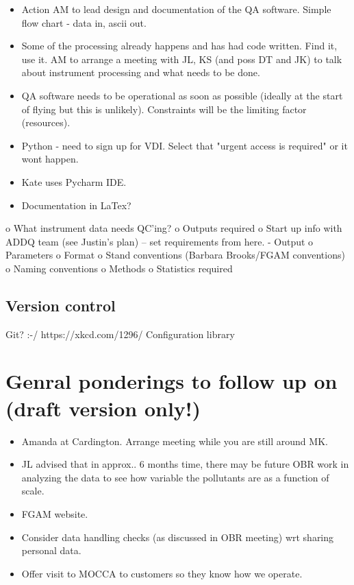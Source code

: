 \documentclass[11pt]{article} %
\begin{document}
\begin{itemize}
\item	Action AM to lead design and documentation of the QA software. Simple flow chart - data in, ascii out. 
\item	Some of the processing already happens and has had code written. Find it, use it. AM to arrange a meeting with JL, KS (and poss DT and JK) to talk about instrument processing and what needs to be done.
\item	QA software needs to be operational as soon as possible (ideally at the start of flying but this is unlikely). Constraints will be the limiting factor (resources). 
\item	Python - need to sign up for VDI. Select that "urgent access is required" or it wont happen.
\item	Kate uses Pycharm IDE.
\item	Documentation in LaTex?
\end{itemize}
o	What instrument data needs QC’ing?
o	Outputs required
o	Start up info with ADDQ team (see Justin’s plan) – set requirements from here.
-	Output
o	Parameters
o	Format 
o	Stand conventions (Barbara Brooks/FGAM conventions) 
o	Naming conventions
o	Methods
o	Statistics required
\subsection{	Version control} %
Git? :-/
https://xkcd.com/1296/
Configuration library

\newpage
\section{Genral ponderings to follow up on (draft version only!)}
\begin{itemize}
\item	Amanda at Cardington. Arrange meeting while you are still around MK.
\item  	JL advised that in approx.. 6 months time, there may be future OBR work in analyzing the data to see how variable the pollutants are as a function of scale.
\item	FGAM website.
\item	Consider data handling checks (as discussed in OBR meeting) wrt sharing personal data.
\item	Offer visit to MOCCA to customers so they know how we operate.
\end{itemize}
\pagebreak
\end{document}
